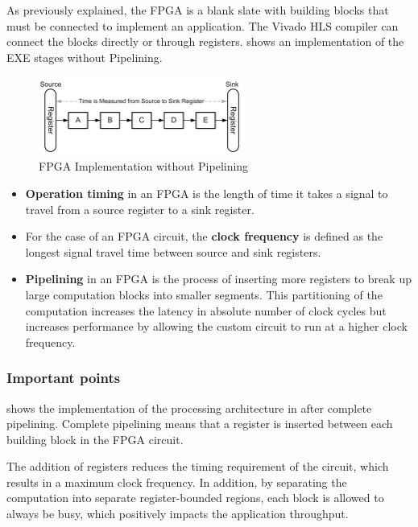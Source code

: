 \par As previously explained, the FPGA is a blank slate with building blocks that must be  connected to implement an application. The Vivado HLS compiler can connect the blocks
directly or through registers.  shows an implementation of the EXE stages without Pipelining.

\begin{figure}[H]
  \begin{center}
      \includegraphics[width=0.6\textwidth]{images/FPGAWOPipe.png}
      \caption{FPGA Implementation without Pipelining}
      \label{FPGAWOPipe}
  \end{center}
\end{figure}

\begin{itemize}
  \item \textbf{Operation timing} in an FPGA is the length of time it takes a signal to travel from a source
  register to a sink register. 
  \item For the case of an FPGA circuit,
  the \textbf{clock frequency} is defined as the longest signal travel time between source and sink
  registers.  
  \item \textbf{Pipelining} in an FPGA is the process of inserting more registers to break up large
  computation blocks into smaller segments. This partitioning of the computation increases
  the latency in absolute number of clock cycles but increases performance by allowing the
  custom circuit to run at a higher clock frequency.
\end{itemize}

\subsubsection{Important points}
 shows the implementation of the processing architecture in  after
complete pipelining. Complete pipelining means that a register is inserted between each
building block in the FPGA circuit. 

The addition of registers reduces the timing requirement
of the circuit, which results in a maximum clock frequency. In
addition, by separating the computation into separate register-bounded regions, each
block is allowed to always be busy, which positively impacts the application throughput.

